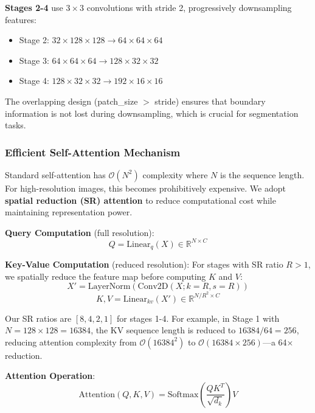 \textbf{Stages 2-4} use $3\times3$ convolutions with stride 2, progressively downsampling features:
\begin{itemize}
    \item Stage 2: $32\times128\times128 \rightarrow 64\times64\times64$
    \item Stage 3: $64\times64\times64 \rightarrow 128\times32\times32$
    \item Stage 4: $128\times32\times32 \rightarrow 192\times16\times16$
\end{itemize}

The overlapping design (patch\_size $>$ stride) ensures that boundary information is not lost during downsampling, which is crucial for segmentation tasks.

\subsubsection{Efficient Self-Attention Mechanism}

Standard self-attention has $\mathcal{O}(N^2)$ complexity where $N$ is the sequence length. For high-resolution images, this becomes prohibitively expensive. We adopt \textbf{spatial reduction (SR) attention} to reduce computational cost while maintaining representation power.

\textbf{Query Computation} (full resolution):
\begin{equation}
Q = \text{Linear}_q(X) \in \mathbb{R}^{N \times C}
\end{equation}

\textbf{Key-Value Computation} (reduced resolution):
For stages with SR ratio $R > 1$, we spatially reduce the feature map before computing $K$ and $V$:
\begin{equation}
X' = \text{LayerNorm}(\text{Conv2D}(X; k=R, s=R))
\end{equation}
\begin{equation}
K, V = \text{Linear}_{kv}(X') \in \mathbb{R}^{N/R^2 \times C}
\end{equation}

Our SR ratios are $[8, 4, 2, 1]$ for stages 1-4. For example, in Stage 1 with $N = 128 \times 128 = 16384$, the KV sequence length is reduced to $16384 / 64 = 256$, reducing attention complexity from $\mathcal{O}(16384^2)$ to $\mathcal{O}(16384 \times 256)$—a 64× reduction.

\textbf{Attention Operation}:
\begin{equation}
\text{Attention}(Q, K, V) = \text{Softmax}(\frac{QK^T}{\sqrt{d_k}})V
\end{equation}

